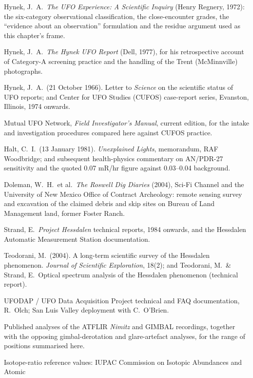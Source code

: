 \begin{srcnotes}
\item Hynek, J.\ A.\ \emph{The UFO Experience: A Scientific Inquiry} (Henry Regnery, 1972):
the six-category observational classification, the close-encounter grades, the ``evidence about an
observation'' formulation and the residue argument used as this chapter's frame.
\item Hynek, J.\ A.\ \emph{The Hynek UFO Report} (Dell, 1977), for his retrospective account of
Category-A screening practice and the handling of the Trent (McMinnville) photographs.
\item Hynek, J.\ A.\ (21 October 1966). Letter to \emph{Science} on the scientific status of UFO
reports; and Center for UFO Studies (CUFOS) case-report series, Evanston, Illinois, 1974 onwards.
\item Mutual UFO Network, \emph{Field Investigator's Manual}, current edition, for the intake and
investigation procedures compared here against CUFOS practice.
\item Halt, C.\ I.\ (13 January 1981). \emph{Unexplained Lights}, memorandum, RAF Woodbridge;
and subsequent health-physics commentary on AN/PDR-27 sensitivity and the quoted 0.07 mR/hr
figure against 0.03--0.04 background.
\item Doleman, W.\ H.\ et al.\ \emph{The Roswell Dig Diaries} (2004), Sci-Fi Channel and the
University of New Mexico Office of Contract Archeology: remote sensing survey and excavation of
the claimed debris and skip sites on Bureau of Land Management land, former Foster Ranch.
\item Strand, E.\ \emph{Project Hessdalen} technical reports, 1984 onwards, and the Hessdalen
Automatic Measurement Station documentation.
\item Teodorani, M.\ (2004). A long-term scientific survey of the Hessdalen phenomenon.
\emph{Journal of Scientific Exploration}, 18(2); and Teodorani, M.\ \& Strand, E.\ Optical
spectrum analysis of the Hessdalen phenomenon (technical report).
\item UFODAP / UFO Data Acquisition Project technical and FAQ documentation, R.\ Olch; San Luis
Valley deployment with C.\ O'Brien.
\item Published analyses of the ATFLIR \emph{Nimitz} and GIMBAL recordings, together with the
opposing gimbal-derotation and glare-artefact analyses, for the range of positions summarised
here.
\item Isotope-ratio reference values: IUPAC Commission on Isotopic Abundances and Atomic

\end{srcnotes}
